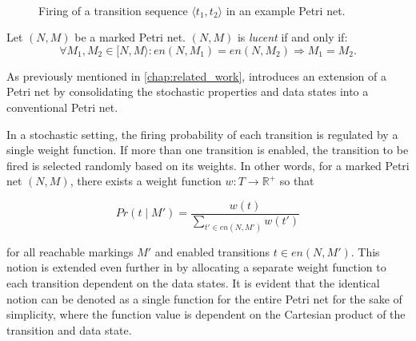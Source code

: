 \begin{figure}[H]
\begin{subfigure}[t]{0.31\textwidth}
    \end{subfigure}
    ~
    \begin{subfigure}[t]{0.31\textwidth}
    \end{subfigure}
    \caption{Firing of a transition sequence $\langle t_1, t_2 \rangle$ in an example Petri net.}
    \label{fig:firing_sequence}
\end{figure}

\begin{definition}[Lucency]
    Let $(N, M)$ be a marked Petri net. $(N, M)$ is \emph{lucent} if and only if:
    \[
        \forall M_1, M_2 \in [N, M \rangle: en(N, M_1) = en(N, M_2) \Rightarrow M_1 = M_2.
    \]
\end{definition}

As previously mentioned in \cref{chap:related_work}, \cite{sldpn} introduces an extension of a Petri net by consolidating the stochastic properties and data states into a conventional Petri net.

In a stochastic setting, the firing probability of each transition is regulated by a single weight function. If more than one transition is enabled, the transition to be fired is selected randomly based on its weights. In other words, for a marked Petri net $(N, M)$, there exists a weight function $w: T \rightarrow \mathbb{R}^+$ so that 

\[ 
    Pr(t \mid M') = \frac{w(t)}{\sum_{t' \in en(N, M')} w(t')}
\]

for all reachable markings $M'$ and enabled transitions $t \in en(N, M')$. This notion is extended even further in \cite{sldpn} by allocating a separate weight function to each transition dependent on the data states. It is evident that the identical notion can be denoted as a single function for the entire Petri net for the sake of simplicity, where the function value is dependent on the Cartesian product of the transition and data state.


